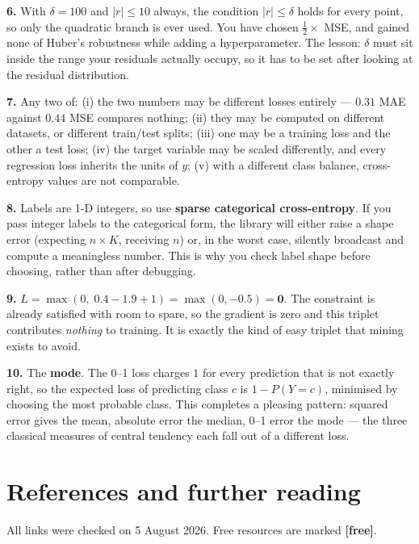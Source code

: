 \documentclass[11pt]{article}
\begin{document}
\medskip
\textbf{6.} With $\delta = 100$ and $\lvert r\rvert \le 10$ always, the
condition $\lvert r\rvert \le \delta$ holds for every point, so only the
quadratic branch is ever used. You have chosen $\tfrac12 \times$ MSE, and gained
none of Huber's robustness while adding a hyperparameter. The lesson: $\delta$
must sit inside the range your residuals actually occupy, so it has to be set
after looking at the residual distribution.

\medskip
\textbf{7.} Any two of: (i) the two numbers may be different losses entirely ---
$0.31$ MAE against $0.44$ MSE compares nothing; (ii) they may be computed on
different datasets, or different train/test splits; (iii) one may be a training
loss and the other a test loss; (iv) the target variable may be scaled
differently, and every regression loss inherits the units of $y$; (v) with a
different class balance, cross-entropy values are not comparable.

\medskip
\textbf{8.} Labels are 1-D integers, so use \textbf{sparse categorical
cross-entropy}. If you pass integer labels to the categorical form, the library
will either raise a shape error (expecting $n \times K$, receiving $n$) or, in
the worst case, silently broadcast and compute a meaningless number. This is
why you check label shape before choosing, rather than after debugging.

\medskip
\textbf{9.} $L = \max(0,\; 0.4 - 1.9 + 1) = \max(0, -0.5) = \mathbf{0}$. The
constraint is already satisfied with room to spare, so the gradient is zero and
this triplet contributes \emph{nothing} to training. It is exactly the kind of
easy triplet that mining exists to avoid.

\medskip
\textbf{10.} The \textbf{mode}. The 0--1 loss charges $1$ for every prediction
that is not exactly right, so the expected loss of predicting class $c$ is
$1 - P(Y = c)$, minimised by choosing the most probable class. This completes a
pleasing pattern: squared error gives the mean, absolute error the median,
0--1 error the mode --- the three classical measures of central tendency each
fall out of a different loss.

\newpage
\section{References and further reading}

All links were checked on 5 August 2026. Free resources are marked
\textbf{[free]}.
\end{document}
